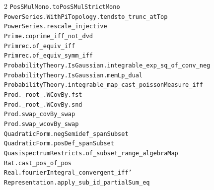 \documentclass[10pt,a4paper]{article}
\begin{document}
\begin{multicols}{2}
\texttt{PosSMulMono.\allowbreak{}toPosSMulStrictMono} \\
\texttt{PowerSeries.\allowbreak{}WithPiTopology.\allowbreak{}tendsto\_trunc\_atTop} \\
\texttt{PowerSeries.\allowbreak{}rescale\_injective} \\
\texttt{Prime.\allowbreak{}coprime\_iff\_not\_dvd} \\
\texttt{Primrec.\allowbreak{}of\_equiv\_iff} \\
\texttt{Primrec.\allowbreak{}of\_equiv\_symm\_iff} \\
\texttt{ProbabilityTheory.\allowbreak{}IsGaussian.\allowbreak{}integrable\_exp\_sq\_of\_conv\_neg} \\
\texttt{ProbabilityTheory.\allowbreak{}IsGaussian.\allowbreak{}memLp\_dual} \\
\texttt{ProbabilityTheory.\allowbreak{}integrable\_map\_cast\_poissonMeasure\_iff} \\
\texttt{Prod.\allowbreak{}\_root\_.\allowbreak{}WCovBy.\allowbreak{}fst} \\
\texttt{Prod.\allowbreak{}\_root\_.\allowbreak{}WCovBy.\allowbreak{}snd} \\
\texttt{Prod.\allowbreak{}swap\_covBy\_swap} \\
\texttt{Prod.\allowbreak{}swap\_wcovBy\_swap} \\
\texttt{QuadraticForm.\allowbreak{}negSemidef\_spanSubset} \\
\texttt{QuadraticForm.\allowbreak{}posDef\_spanSubset} \\
\texttt{QuasispectrumRestricts.\allowbreak{}of\_subset\_range\_algebraMap} \\
\texttt{Rat.\allowbreak{}cast\_pos\_of\_pos} \\
\texttt{Real.\allowbreak{}fourierIntegral\_convergent\_iff'} \\
\texttt{Representation.\allowbreak{}apply\_sub\_id\_partialSum\_eq} \\

\end{multicols}
\end{document}
